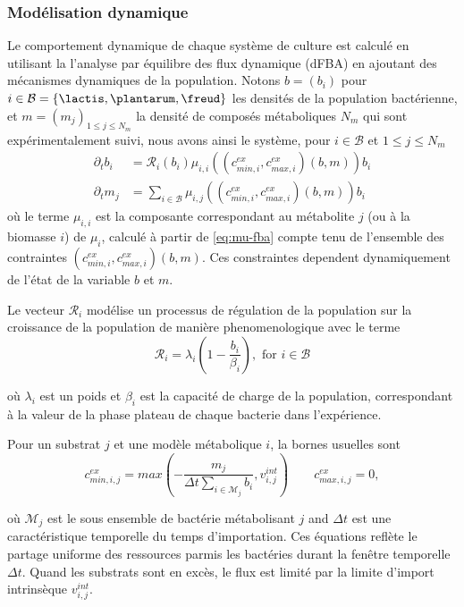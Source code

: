\documentclass[../main.tex]{subfiles}
\begin{document}
\subsubsection{Modélisation dynamique} Le comportement dynamique de chaque système de culture est calculé en utilisant la l'analyse par équilibre des flux dynamique (dFBA) \citep{Mahadevan.2002} en ajoutant des mécanismes dynamiques de la population. Notons $b=(b_i)$ pour $i \in \mathcal{B}=\{\lactis,\plantarum,\freud\}$ les densités de la population bactérienne, et $m=(m_j)_{1\leq j \leq N_m}$ la densité de composés métaboliques $N_m$ qui sont expérimentalement suivi, nous avons ainsi le système, pour $i\in \mathcal{B}$ et $1\leq j \leq N_m$
\begin{align}
    \label{eq:system_dynamics_b}
    \partial_t b_i& = \mathcal{R}_{i}(b_i) {\mu}_{i,i}\left((c^{ex}_{min,i},c^{ex}_{max,i})(b,m)\right) b_i  \\
    \label{eq:system_dynamics_m}
    \partial_t m_j &= \sum_{i \in \mathcal{B}} {\mu}_{i,j}\left((c^{ex}_{min,i},c^{ex}_{max,i})(b,m)\right) b_i 
\end{align}
où le terme ${\mu}_{i,i}$ est la composante correspondant au métabolite $j$ (ou à la biomasse $i$) de $\mu_i$, calculé à partir de \ref{eq:mu-fba} compte tenu de l'ensemble des contraintes $(c^{ex}_{min,i},c^{ex}_{max,i})(b,m)$. Ces constraintes dependent dynamiquement de l'état de la variable $b$ et $m$.

Le vecteur  $\mathcal{R}_{i}$ modélise un processus de régulation de la population sur la croissance de la population de manière phenomenologique avec le terme 
\begin{equation}
\label{eq:logistic-growth}
    \mathcal{R}_{i} = \lambda_i (1-\frac{b_i}{\beta_i}), \text{ for }i \in \mathcal{B} 
\end{equation}

où $\lambda_i$ est un poids et $\beta_i$ est la capacité de charge de la population, correspondant à la valeur de la phase plateau de chaque bacterie dans l'expérience. 

Pour un substrat $j$ et une modèle métabolique $i$, la bornes usuelles sont
\begin{equation} 
c^{ex}_{min,i,j} = max(-\frac{m_j}{\Delta t \sum_{i\in \mathcal{M}_j} b_i},v^{int}_{i,j}) \quad \quad c^{ex}_{max,i,j} = 0,
\label{eq:usual-consumption-limitation}
\end{equation}

où $\mathcal{M}_j$ est le sous ensemble de bactérie métabolisant $j$ and $\Delta t$ est une caractéristique temporelle du temps d'importation. Ces équations reflète le partage uniforme des ressources parmis les bactéries durant la fenêtre temporelle $\Delta t$. Quand les substrats sont en excès, le flux est limité par la limite d'import intrinsèque $v^{int}_{i,j}$.
\end{document}
